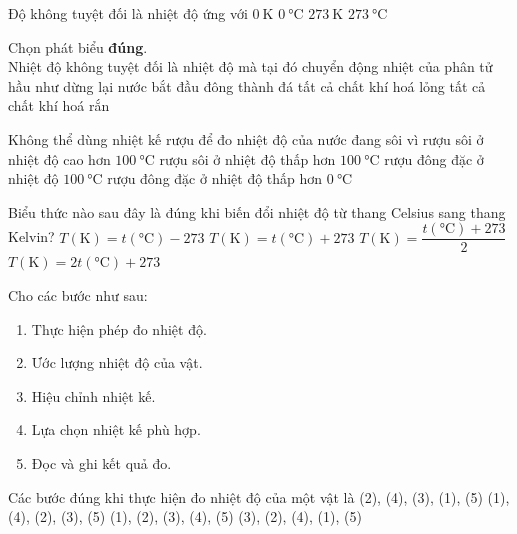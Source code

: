 \begin{ex}
	Độ không tuyệt đối là nhiệt độ ứng với
	\choice
	{\True $\SI{0}{\kelvin}$}
	{$\SI{0}{\celsius}$}
	{$\SI{273}{\kelvin}$}
	{$\SI{273}{\celsius}$}
	\loigiai{
		
	}
\end{ex}
\begin{ex}
	Chọn phát biểu \textbf{đúng}.\\
	Nhiệt độ không tuyệt đối là nhiệt độ mà tại đó
	\choice
	{\True chuyển động nhiệt của phân tử hầu như dừng lại}
	{nước bắt đầu đông thành đá}
	{tất cả chất khí hoá lỏng}
	{tất cả chất khí hoá rắn}
	\loigiai{
		
	}
\end{ex}
\begin{ex}
Không thể dùng nhiệt kế rượu để đo nhiệt độ của nước đang sôi vì
	\choice
	{rượu sôi ở nhiệt độ cao hơn $\SI{100}{\celsius}$}
	{\True rượu sôi ở nhiệt độ thấp hơn $\SI{100}{\celsius}$}
	{rượu đông đặc ở nhiệt độ $\SI{100}{\celsius}$}
	{rượu đông đặc ở nhiệt độ thấp hơn $\SI{0}{\celsius}$}
	\loigiai{
		
	}
\end{ex}
\begin{ex}
Biểu thức nào sau đây là đúng khi biến đổi nhiệt độ từ thang Celsius sang thang Kelvin?
	\choice
	{$T\left(\si{\kelvin}\right)=t\left(\si{\celsius}\right)-273$}
	{\True $T\left(\si{\kelvin}\right)=t\left(\si{\celsius}\right)+273$}
	{$T\left(\si{\kelvin}\right)=\dfrac{t\left(\si{\celsius}\right)+273}{2}$}
	{$T\left(\si{\kelvin}\right)=2t\left(\si{\celsius}\right)+273$}
	\loigiai{
		
	}
\end{ex}
\begin{ex}
Cho các bước như sau:
\begin{enumerate}[label=(\arabic*)]
	\item Thực hiện phép đo nhiệt độ.
	\item Ước lượng nhiệt độ của vật.
	\item Hiệu chỉnh nhiệt kế.
	\item Lựa chọn nhiệt kế phù hợp.
	\item Đọc và ghi kết quả đo.
\end{enumerate}
Các bước đúng khi thực hiện đo nhiệt độ của một vật là
	\choice
	{\True (2), (4), (3), (1), (5)}
	{(1), (4), (2), (3), (5)}
	{(1), (2), (3), (4), (5)}
	{(3), (2), (4), (1), (5)}
	\loigiai{
		
	}
\end{ex}

